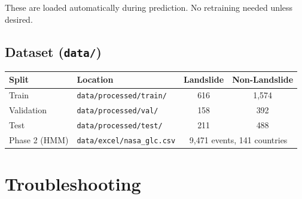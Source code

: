 \documentclass[11pt]{article}
\begin{document}
These are loaded automatically during prediction. No retraining needed unless desired.

\subsection{Dataset (\texttt{data/})}

\begin{table}[H]
    \centering
    \renewcommand{\arraystretch}{1.2}
    \begin{tabular}{llcc}
        \toprule
        \textbf{Split} & \textbf{Location} & \textbf{Landslide} & \textbf{Non-Landslide} \\
        \midrule
        Train & \texttt{data/processed/train/} & 616 & 1,574 \\
        Validation & \texttt{data/processed/val/} & 158 & 392 \\
        Test & \texttt{data/processed/test/} & 211 & 488 \\
        \midrule
        Phase 2 (HMM) & \texttt{data/excel/nasa\_glc.csv} & \multicolumn{2}{c}{9,471 events, 141 countries} \\
        \bottomrule
    \end{tabular}
\end{table}

\section{Troubleshooting}
\end{document}
